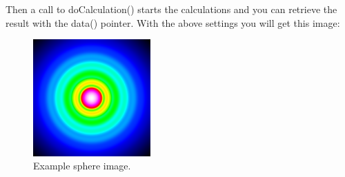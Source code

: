 \documentclass[11pt]{article} %
\begin{document}
Then a call to doCalculation() starts the calculations and you can retrieve the result with the data() pointer. With the above settings you will get this image:
\begin{figure}[H]
 \centering
 \includegraphics[width=0.4\textwidth]{Vitess-Sphere.png}
 \caption{Example sphere image.}
\end{figure}
\end{document}
